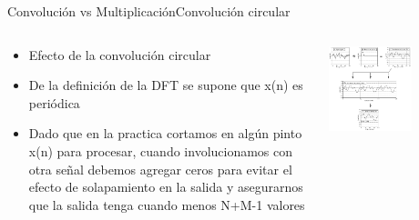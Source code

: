 \begin{frame}[t]{Convolución vs Multiplicación}{Convolución circular}
   \begin{columns}[t]
      \begin{column}{.5\textwidth}
         \begin{itemize}
            \item{Efecto de la convolución circular}
            \item{De la definición de la DFT se supone que x(n) es periódica}
            \item{Dado que en la practica cortamos en algún pinto x(n) para procesar, cuando involucionamos con otra señal debemos agregar ceros para evitar el efecto de solapamiento en la salida y asegurarnos que la salida tenga cuando menos N+M-1 valores}
         \end{itemize}
      \end{column}
      \hspace{2pt}
      \vrule
      \hspace{2pt}
      \begin{column}{.5\textwidth}
         \center\includegraphics[width=0.6\textwidth]{5_clase/teorema_conv2}
      \end{column}
      \hspace{2pt}
   \end{columns}
   \vfill
\end{frame}

